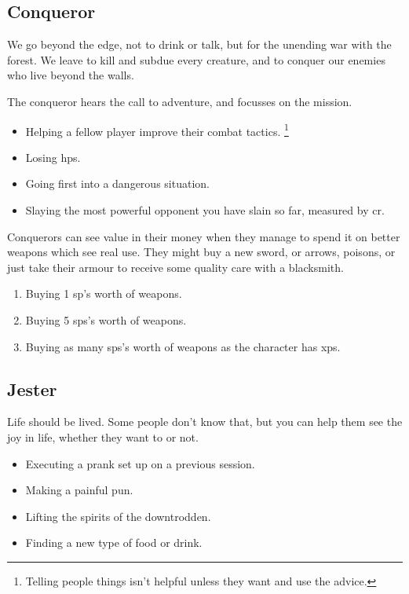 \begin{multicols}{2}
\subsection{Conqueror}
\label{conqueror}

We go beyond the \gls{edge}, not to drink or talk, but for the unending war with the forest.
We leave to kill and subdue every creature, and to conquer our enemies who live beyond the walls.

The conqueror hears the call to adventure, and focusses on the mission.

\begin{itemize}
  \item
  Helping a fellow player improve their combat tactics.%
  \footnote{Telling people things isn't helpful unless they want and use the advice.}
  \item
  Losing \glspl{hp}.
  \item
  Going first into a dangerous situation.
  \item
  Slaying the most powerful opponent you have slain so far, measured by \gls{cr}.
\end{itemize}

Conquerors can see value in their money when they manage to spend it on better weapons which see real use.
They might buy a new sword, or arrows, poisons, or just take their armour to receive some quality care with a blacksmith.

\begin{enumerate}
  \item
  Buying 1 \gls{sp}'s worth of weapons.
  \item
  Buying 5 \glspl{sp}'s worth of weapons.
  \item
  Buying as many \glspl{sp}'s worth of weapons as the character has \glspl{xp}.
\end{enumerate}

\subsection{Jester}
\label{jester}

Life should be lived.
Some people don't know that, but you can help them see the joy in life, whether they want to or not.

\begin{itemize}
  \item
  Executing a prank set up on a previous session.
  \item
  Making a painful pun.
  \item
  Lifting the spirits of the downtrodden.
  \item
  Finding a new type of food or drink.
\end{itemize}


\end{multicols}
